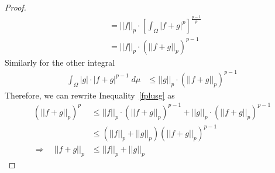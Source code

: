 \documentclass[12pt]{article}
\theoremstyle{plain}
\theoremstyle{definition}
\theoremstyle{remark}
\begin{document}
\begin{proof}
\begin{align*}
  &=
  ||f||_p \cdot
  \left[
    \int_\Omega |f+g|^p
  \right]^\frac{p-1}{p} \\
  &=
  ||f||_p \cdot
  \left(||f+g||_p\right)^{p-1}
\end{align*}
Similarly for the other integral
\begin{align*}
  \int_\Omega |g|\cdot |f+g|^{p-1}\; d\mu
  &\leq
  ||g||_p \cdot
  \left(||f+g||_p\right)^{p-1}
\end{align*}
Therefore, we can rewrite Inequality~\ref{fplusg} as
\begin{align*}
  \left(||f+g||_p\right)^p
  &\leq
  ||f||_p \cdot
  \left(||f+g||_p\right)^{p-1}
  +
  ||g||_p \cdot
  \left(||f+g||_p\right)^{p-1} \\
  &\leq
  \left(||f||_p + ||g||_p \right)
  \left(||f+g||_p\right)^{p-1} \\
  \Rightarrow\quad
  ||f+g||_p
  &\leq
  ||f||_p + ||g||_p
\end{align*}
\end{proof}
\end{document}

